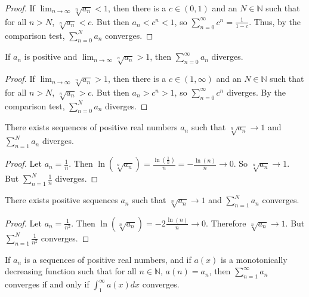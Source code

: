 \documentclass[crop=false,class=book]{standalone}
\begin{document}
\begin{proof}
If $\lim_{n\rightarrow \infty}\sqrt[n]{a_n}<1$, then there is a $c\in (0,1)$ and an $N\in \mathbb{N}$ such that for all $n>N$, $\sqrt[n]{a_n}<c$. But then $a_n<c^n<1$, so $\sum_{n=0}^{\infty}c^n = \frac{1}{1-c}$. Thus, by the comparison test, $\sum_{n=0}^{N}a_n$ converges.
\end{proof}
\begin{theorem*}
If $a_n$ is positive and $\lim_{n\rightarrow \infty} \sqrt[n]{a_n}>1$, then $\sum_{n=0}^{\infty} a_n$ diverges.
\end{theorem*}
\begin{proof}
If $\lim_{n\rightarrow \infty}\sqrt[n]{a_n}>1$, then there is a $c\in (1,\infty)$ and an $N\in \mathbb{N}$ such that for all $n>N$, $\sqrt[n]{a_n}>c$. But then $a_n>c^n>1$, so $\sum_{n=0}^{\infty}c^n$ diverges. By the comparison test, $\sum_{n=0}^{N}a_n$ diverges.
\end{proof}
\begin{theorem*}
There exists sequences of positive real numbers $a_n$ such that $\sqrt[n]{a_n} \rightarrow 1$ and $\sum_{n=1}^{N} a_n$ diverges.
\end{theorem*}
\begin{proof}
Let $a_n = \frac{1}{n}$. Then $\ln(\sqrt[n]{a_n}) = \frac{\ln(\frac{1}{n})}{n} = -\frac{\ln(n)}{n} \rightarrow 0$. So $\sqrt[n]{a_n} \rightarrow 1$. But $\sum_{n=1}^{N} \frac{1}{n}$ diverges.
\end{proof}
\begin{theorem*}
There exists positive sequences $a_{n}$ such that $\sqrt[n]{a_n} \rightarrow 1$ and $\sum_{n=1}^{N}a_n$ converges.
\end{theorem*}
\begin{proof}
Let $a_{n}=\frac{1}{n^2}$. Then $\ln(\sqrt[n]{a_n})=-2\frac{\ln(n)}{n}\rightarrow 0$. Therefore $\sqrt[n]{a_n}\rightarrow 1$. But $\sum_{n=1}^{N}\frac{1}{n^2}$ converges.
\end{proof}
\begin{theorem*}
If $a_n$ is a sequences of positive real numbers, and if $a(x)$ is a monotonically decreasing function such that for all $n\in \mathbb{N}$, $a(n) = a_n$, then $\sum_{n=1}^{\infty} a_n$ converges if and only if $\int_{1}^{\infty} a(x)dx$ converges.
\end{theorem*}
\end{document}
